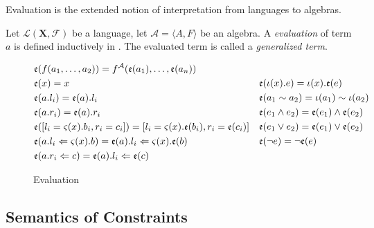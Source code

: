 \begin{defn}[Evaluation]
  Evaluation is the extended notion of interpretation from languages to algebras.

  Let $\mathcal{L}(\textbf{X}, \mathscr{F})$ be a language, let $\mathcal{A} = \langle A , F \rangle$ be
  an algebra. A \emph{evaluation} of term $a$ is defined inductively in
  . The evaluated term is called a \emph{generalized term}.

  \begin{figure*}[h]
    \centering
    \begin{alignat*}{2}
      \begin{aligned}
        & \mathfrak{e}({f(a_1 , \ldots, a_2)}) = f^{\mathcal{A}}(\mathfrak{e}({a_1}) , \ldots , \mathfrak{e}({a_n}))\\
        & \mathfrak{e}({x}) = x\\
        & \mathfrak{e}({a.l_i}) = \mathfrak{e}({a}).l_i\\
        & \mathfrak{e}({a.r_i}) = \mathfrak{e}({a}).r_i\\
        & \mathfrak{e}({[l_i = \varsigma(x) . b_i , r_i = c_i]}) =  [l_i = \varsigma(x) . \mathfrak{e}({b_i}) , r_i = \mathfrak{e}({c_i})]\\
        & \mathfrak{e}({a.l_i \Leftarrow \varsigma (x) . b}) = \mathfrak{e}({a}).l_i \Leftarrow \varsigma(x) . \mathfrak{e}({b})\\
        & \mathfrak{e}({a.r_i \Leftarrow c}) = \mathfrak{e}({a}).l_i \Leftarrow \mathfrak{e}({c})
      \end{aligned}
          \quad
      \begin{aligned}
        & \mathfrak{e}({\iota(x) . e}) = \iota(x) . \mathfrak{e}({e})\\
        & \mathfrak{e}({a_1 \sim a_2}) = \iota(a_1) \sim \iota(a_2)\\
        & \mathfrak{e}({e_1 \land e_2}) = \mathfrak{e}({e_1}) \land \mathfrak{e}({e_2})\\
        & \mathfrak{e}({e_1 \vee e_2})   = \mathfrak{e}({e_1}) \vee \mathfrak{e}({e_2})\\
        & \mathfrak{e}({\neg e})         = \neg \mathfrak{e}({e})\\
      \end{aligned}
    \end{alignat*}
    \caption{Evaluation}
    \label{Oc:evaluation}
  \end{figure*}

\end{defn}

\subsection{Semantics of Constraints}

